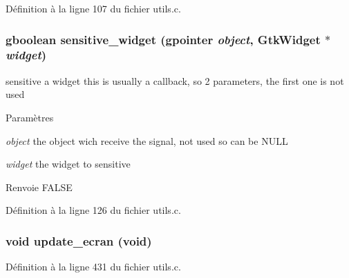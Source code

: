 Définition à la ligne 107 du fichier utils.c.

\subsubsection[{sensitive\_\-widget}]{\setlength{\rightskip}{0pt plus 5cm}gboolean sensitive\_\-widget (gpointer {\em object}, \/  GtkWidget $\ast$ {\em widget})}\label{utils_8h_a1902d3a5ef1f0899109cd68bf014c7b6}
sensitive a widget this is usually a callback, so 2 parameters, the first one is not used


\begin{DoxyParams}{Paramètres}
\item[{\em object}]the object wich receive the signal, not used so can be NULL \item[{\em widget}]the widget to sensitive\end{DoxyParams}
\begin{DoxyReturn}{Renvoie}
FALSE 
\end{DoxyReturn}


Définition à la ligne 126 du fichier utils.c.

\subsubsection[{update\_\-ecran}]{\setlength{\rightskip}{0pt plus 5cm}void update\_\-ecran (void)}\label{utils_8h_a07c1464833b8611d864feba6eee2d8e1}


Définition à la ligne 431 du fichier utils.c.

